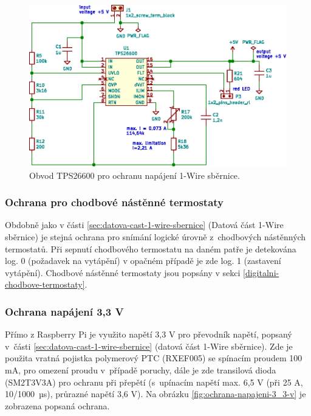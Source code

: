 \begin{figure}[H]
    \centering
    \includegraphics[width=\textwidth]{images/svg/kicad/ochrana-napajeni-1-wire.eps}
    \caption[Obvod TPS26600 pro ochranu napájení 1-Wire sběrnice.]{Obvod TPS26600 pro ochranu napájení 1-Wire sběrnice.}
    \label{fig:ochrana-napajeni-1-wire}
\end{figure}

\subsubsection{Ochrana pro chodbové nástěnné termostaty}
Obdobně jako v části \ref{sec:datova-cast-1-wire-sbernice} (Datová část 1-Wire sběrnice) je stejná ochrana pro snímání logické úrovně z~chodbových nástěnných termostatů. Při sepnutí chodbového termostatu na daném patře je detekována log. 0 (požadavek na vytápění) v opačném případě je zde log. 1 (zastavení vytápění). Chodbové nástěnné termostaty jsou popsány v sekci \ref{digitalni-chodbove-termostaty}.

\subsubsection{Ochrana napájení 3,3 V}
Přímo z Raspberry Pi je využito napětí 3,3 V pro převodník napětí, popsaný v~části \ref{sec:datova-cast-1-wire-sbernice} (datová část 1-Wire sběrnice). Zde je použita vratná pojistka polymerový PTC (RXEF005) se spínacím proudem 100 mA, pro omezení proudu v~případě poruchy, dále je zde transilová dioda (SM2T3V3A) pro ochranu při přepětí (s~upínacím napětí max. 6,5 V (při 25 A, 10/1000~µs), průrazné napětí 3,6 V). Na obrázku \ref{fig:ochrana-napajeni-3_3-v} je zobrazena popsaná ochrana.

